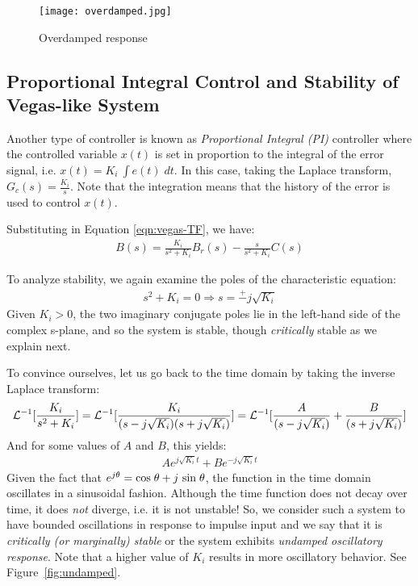 \documentclass{article}
\def\L{{\cal L}}
\def\sn{{\rm sin}}
\def\cs{{\rm cos}}
\begin{document}
\begin{figure}[htbp] %
   \centering
   \texttt{[image: overdamped.jpg]} 
   \caption{Overdamped response}
   \label{fig:overdamped}
\end{figure}

\subsection{Proportional Integral Control and Stability of Vegas-like System}

Another type of controller is known as {\em Proportional Integral (PI)} controller where
the controlled variable $x(t)$ is set in proportion to the integral of the error signal,
i.e. $x(t) = K_i\ \int e(t) \; dt$.
In this case, 
taking the Laplace transform, $G_c(s) = \frac{K_i}{s}$. 
Note that the integration means that the history of the error is used to control $x(t)$.

Substituting in Equation \ref{eqn:vegas-TF}, we have:
\begin{eqnarray}
B(s) = \frac{K_i}{s^2 + K_i} B_r(s) - \frac{s}{s^2 + K_i} C(s)
\label{eqn:PI-ess}
\end{eqnarray}

To analyze stability, we again examine the poles of the characteristic equation:
\begin{eqnarray*}
s^2 + K_i = 0  \Rightarrow s = \stackrel{+}{-} j \sqrt{K_i}
\end{eqnarray*}
Given $K_i > 0$, the two imaginary conjugate poles lie in the left-hand side of the complex s-plane,
and so the system is stable, though {\em critically} stable as we explain next.

To convince ourselves, let us go back to the time domain by taking the inverse Laplace transform:
\begin{eqnarray*}
\L^{-1}[\frac{K_i}{s^2 + K_i}] = \L^{-1}[\frac{K_i}{(s - j \sqrt{K_i})(s + j \sqrt{K_i})}] =
\L^{-1}[\frac{A}{(s - j \sqrt{K_i})} + \frac{B}{(s + j \sqrt{K_i})}] 
\end{eqnarray*}
And for some values of $A$ and $B$, this yields:
\begin{eqnarray*}
A e^{j \sqrt{K_i}t} + B e^{- j \sqrt{K_i}t}
\end{eqnarray*}
Given the fact that $e^{j \theta} =  \cs \; \theta + j \ \sn \; \theta$,
the function in the time domain oscillates in a sinusoidal fashion.
Although the time function does not decay over time,
it does {\em not} diverge, i.e. it is not unstable! 
So, we consider such a system to have bounded oscillations in response to
impulse input and we say that it is {\em critically (or marginally) stable} or 
the system exhibits  {\em undamped oscillatory response}.
Note that a higher value of $K_i$ results in more oscillatory behavior.
See Figure~\ref{fig:undamped}.
\end{document}
